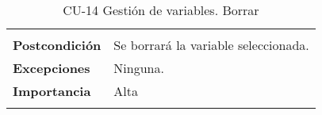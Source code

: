 \begin{longtable}[H]{@{}ll@{}}
\begin{minipage}[t]{0.71\columnwidth}
\end{minipage}\tabularnewline
\begin{minipage}[t]{0.23\columnwidth}\raggedright\strut
\textbf{Postcondición}\strut
\end{minipage} & \begin{minipage}[t]{0.71\columnwidth}\raggedright\strut
Se borrará la variable seleccionada.\strut
\end{minipage}\tabularnewline
\begin{minipage}[t]{0.23\columnwidth}\raggedright\strut
\textbf{Excepciones}\strut
\end{minipage} & \begin{minipage}[t]{0.71\columnwidth}\raggedright\strut
Ninguna. \strut
\end{minipage}\tabularnewline
\begin{minipage}[t]{0.23\columnwidth}\raggedright\strut
\textbf{Importancia}\strut
\end{minipage} & \begin{minipage}[t]{0.71\columnwidth}\raggedright\strut
Alta\strut
\end{minipage}\tabularnewline
\bottomrule
\caption{CU-14 Gestión de variables. Borrar}
\end{longtable}

